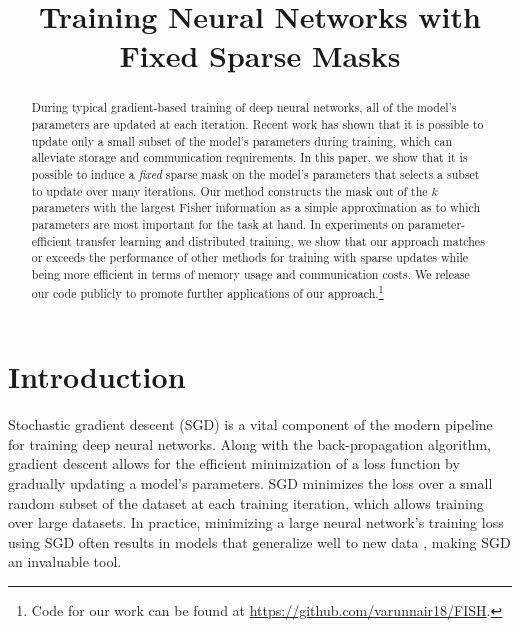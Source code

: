 \title{Training Neural Networks with Fixed Sparse Masks}

\begin{abstract}
During typical gradient-based training of deep neural networks, all of the model's parameters are updated at each iteration. Recent work has shown that it is possible to update only a small subset of the model's parameters during training, which can alleviate storage and communication requirements. In this paper, we show that it is possible to induce a \textit{fixed} sparse mask on the model’s parameters that selects a subset to update over many iterations. Our method constructs the mask out of the $k$ parameters with the largest Fisher information as a simple approximation as to which parameters are most important for the task at hand. In experiments on parameter-efficient transfer learning and distributed training, we show that our approach matches or exceeds the performance of other methods for training with sparse updates while being more efficient in terms of memory usage and communication costs. We release our code publicly to promote further applications of our approach.\footnote{Code for our work can be found at \url{https://github.com/varunnair18/FISH}.}
\end{abstract}

\section{Introduction}

Stochastic gradient descent (SGD) is a vital component of the modern pipeline for training deep neural networks. Along with the back-propagation algorithm, gradient descent allows for the efficient minimization of a loss function by gradually updating a model's parameters. SGD minimizes the loss over a small random subset of the dataset at each training iteration, which allows training over large datasets. In practice, minimizing a large neural network's training loss using SGD often results in models that generalize well to new data \citep{DBLP:journals/corr/abs-1811-04918,hardt2016train,lecun2012efficient}, making SGD an invaluable tool.

